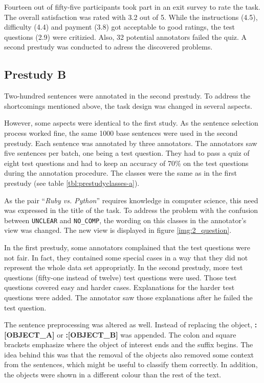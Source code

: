 Fourteen out of fifty-five participants took part in an exit survey to rate the task. The overall satisfaction was rated with 3.2 out of 5. While the instructions (4.5), difficulty (4.4) and payment (3.8) got acceptable to good ratings, the test questions (2.9) were critizied. Also, 32 potential annotators failed the quiz. A second prestudy was conducted to adress the discovered problems.



\subsection{Prestudy B}
Two-hundred sentences were annotated in the second prestudy. To address the shortcomings mentioned above, the task design was changed in several aspects.

However, some aspects were identical to the first study. As the sentence selection process worked fine, the same 1000 base sentences were used in the second prestudy.  Each sentence was annotated by three annotators. The annotators saw five sentences per batch, one being a test question. They had to pass a quiz of eight test questions and had to keep an accuracy of 70\% on the test questions during the annotation procedure. The classes were the same as in the first prestudy (see table \ref{tbl:prestudyclasses-a}).

As the pair \enquote{\emph{Ruby vs. Python}} requires knowledge in computer science, this need was expressed in the title of the task.
To address the problem with the confusion between \texttt{UNCLEAR} and \texttt{NO\_COMP}, the wording on this classes in the annotator's view was changed. The new view is displayed in figure \ref{img:2_question}. 

In the first prestudy, some annotators complained that the test questions were not fair. In fact, they contained some special cases in a way that they did not represent the whole data set appropriatly. In the second prestudy, more test questions (fifty-one instead of twelve) test questions were used. Those test questions covered easy and harder cases. Explanations for the harder test questions were added. The annotator saw those explanations after he failed the test question.

The sentence preprocessing was altered as well. Instead of replacing the object, \mbox{\textbf{{\color[HTML]{9A14B2}:{[}OBJECT\_A{]}}}} or \textbf{{\color[HTML]{6CB219}:{[}OBJECT\_B{]}}} was appended. The colon and square brackets emphasize where the object of interest ends and the suffix begins. The idea behind this was that the removal of the objects also removed some context from the sentences, which might be useful to classify them correctly. In addition, the objects were shown in a different colour than the rest of the text.\newline

